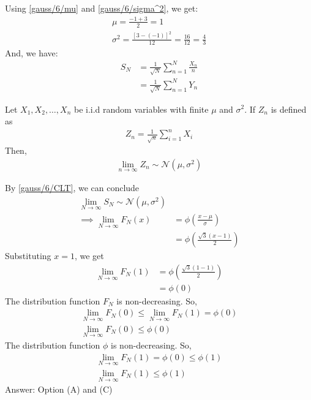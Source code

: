 Using \eqref{gauss/6/mu} and \eqref{gauss/6/sigma^2}, we get:
\begin{align}
    \mu = \frac{-1 + 3}{2} = 1\\
    \sigma^2 = \frac{[3 - (-1)]^2}{12} = \frac{16}{12} = \frac{4}{3}
\end{align}
And, we have:
\begin{align}
  S_N &= \frac{1}{\sqrt{N}} \sum_{n=1}^N \frac{X_n}{n} \\
      &= \frac{1}{\sqrt{N}} \sum_{n=1}^N Y_n
\end{align}
\begin{lemma}
Let $X_1,X_2,\dots,X_n$ be i.i.d random variables with finite $\mu$ and $\sigma^2$. If $Z_n$ is defined as
\begin{align}
  Z_n = \frac{1}{\sqrt{n}} \sum_{i=1}^n X_i
 \end{align}
Then,
\begin{align}
   \lim_{n \to \infty} Z_n \sim \mathcal N(\mu,\sigma^2) \label{gauss/6/CLT}
\end{align}
\end{lemma}
By \eqref{gauss/6/CLT}, we can conclude
\begin{align}
\lim_{N\to\infty} S_N \sim \mathcal N(\mu,\sigma^2)\\
\implies \lim_{N\to\infty} F_N(x) &= \phi\left(\frac{x-\mu}{\sigma}\right)\\
&= \phi\left(\frac{\sqrt{3}(x-1)}{2}\right)
\end{align}
Substituting $x=1$, we get
\begin{align}
    \lim_{N\to\infty} F_N(1) &=  \phi\left(\frac{\sqrt{3}(1-1)}{2}\right)\\
    &= \phi(0)
\end{align}
The distribution function $F_N$ is non-decreasing. So,
\begin{align}
    \lim_{N\to\infty} F_N(0) \leq \lim_{N\to\infty} F_N(1) = \phi(0)\\
    \lim_{N\to\infty} F_N(0) \leq \phi(0)
\end{align}
The distribution function $\phi$ is non-decreasing. So,
\begin{align}
    \lim_{N\to\infty} F_N(1) = \phi(0) \leq \phi(1)\\
    \lim_{N\to\infty} F_N(1) \leq \phi(1)
\end{align}
Answer: Option (A) and (C)